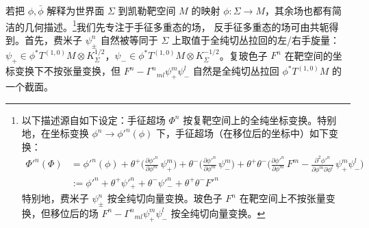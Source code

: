 若把 $\phi,\bar\phi$ 解释为世界面 $\Sigma$ 到凯勒靶空间 $M$ 的映射 $\phi:\Sigma\to M$，其余场也都有简洁的几何描述。\footnote{以下描述源自如下设定：手征超场 $\Phi^n$ 按复靶空间上的全纯坐标变换。特别地，在坐标变换 $\phi^n\to\phi'^n(\phi)$ 下，手征超场（在移位后的坐标中）如下变换：
\[
\begin{aligned}
\Phi'^n(\Phi)&=\phi'^n(\phi)+\theta^+\Big(\frac{\partial\phi'^n}{\partial\phi^m}\,\psi^m_+\Big)+\theta^-\Big(\frac{\partial\phi'^n}{\partial\phi^m}\,\psi^m_-\Big)+\theta^+\theta^-\Big(\frac{\partial\phi'^n}{\partial\phi^m}\,F^m-\frac{\partial^2\phi'^n}{\partial\phi^m\partial\phi^l}\,\psi^m_+\psi^l_-\Big)\\
&:=\phi'^n+\theta^+\psi'^n_++\theta^-\psi'^n_-+\theta^+\theta^-F'^n
\end{aligned}
\]
特别地，费米子 $\psi^n_\pm$ 按全纯切向量变换。玻色子 $F^n$ 在靶空间上不按张量变换，但移位后的场 $F^n-\Gamma^n{}_{ml}\psi^m_+\psi^l_-$ 按全纯切向量变换。}我们先专注于手征多重态的场，
反手征多重态的场可由共轭得到。首先，费米子 $\psi^n_\pm$ 自然被等同于 $\Sigma$ 上取值于全纯切丛拉回的左/右手旋量：$\psi_+\in\phi^*T^{(1,0)}M\otimes K_\Sigma^{1/2}$，$\psi_-\in\phi^*T^{(1,0)}M\otimes K_\Sigma^{-1/2}$。复玻色子 $F^n$ 在靶空间的坐标变换下不按张量变换，但 $F^n-\Gamma^n{}_{ml}\psi^m_+\psi^l_-$ 自然是全纯切丛拉回 $\phi^*T^{(1,0)}M$ 的一个截面。

